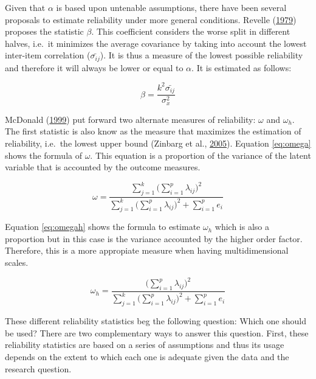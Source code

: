 \documentclass[]{book}
\begin{document}
Given that \(\alpha\) is based upon untenable assumptions, there have been several proposals to estimate reliability under more general conditions. Revelle (\protect\hyperlink{ref-Revelle1979}{1979}) proposes the statistic \(\beta\). This coefficient considers the worse split in different halves, i.e.~it minimizes the average covariance by taking into account the lowest inter-item correlation (\(\bar{\sigma_{ij}}\)). It is thus a measure of the lowest possible reliability and therefore it will always be lower or equal to \(\alpha\). It is estimated as follows:

\begin{equation}
\label{eq:beta}
 \beta = \frac{k^2 \bar{\sigma_{ij}}} {\sigma^{2}_{x}}
\end{equation}

McDonald (\protect\hyperlink{ref-McDonald1999}{1999}) put forward two alternate measures of reliability: \(\omega\) and \(\omega_h\). The first statistic is also know as the measure that maximizes the estimation of reliability, i.e.~the lowest upper bound (Zinbarg et al., \protect\hyperlink{ref-Zinbarg2005}{2005}). Equation \eqref{eq:omega} shows the formula of \(\omega\). This equation is a proportion of the variance of the latent variable that is accounted by the outcome measures.

\begin{equation}
\label{eq:omega}
 \omega = \frac{ \sum\limits_{j=1}^k  \bigg(\sum\limits_{i=1}^p \lambda_{ij}\bigg)^2 } {\sum\limits_{j=1}^k  \bigg(\sum\limits_{i=1}^p \lambda_{ij}\bigg)^2 + \sum\limits_{i=1}^p e_i}
\end{equation}

Equation \eqref{eq:omegah} shows the formula to estimate \(\omega_h\) which is also a proportion but in this case is the variance accounted by the higher order factor. Therefore, this is a more appropiate measure when having multidimensional scales.

\begin{equation}
\label{eq:omegah}
\omega_h = \frac{  \bigg(\sum\limits_{i=1}^p \lambda_{ij}\bigg) ^2 } {\sum\limits_{j=1}^k  \bigg(\sum\limits_{i=1}^p \lambda_{ij}\bigg) ^2 + \sum\limits_{i=1}^p e_i}
\end{equation}

These different reliability statistics beg the following question: Which one should be used? There are two complementary ways to answer this question. First, these reliability statistics are based on a series of assumptions and thus its usage depends on the extent to which each one is adequate given the data and the research question.
\end{document}

